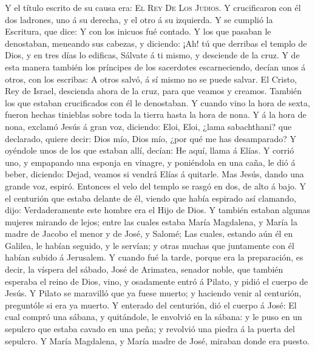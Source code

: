  Y el título escrito de su causa era: \textsc{El}
\textsc{Rey} \textsc{De} \textsc{Los} \textsc{Judios}.  Y
crucificaron con él dos ladrones, uno á su derecha, y el otro á su
izquierda.  Y se cumplió la Escritura, que dice: Y con
los inicuos fué contado.  Y los que pasaban le
denostaban, meneando sus cabezas, y diciendo: ¡Ah! tú que derribas el
templo de Dios, y en tres días lo edificas,  Sálvate á ti
mismo, y desciende de la cruz.  Y de esta manera también
los príncipes de los sacerdotes escarneciendo, decían unos á otros, con
los escribas: A otros salvó, á sí mismo no se puede salvar.
 El Cristo, Rey de Israel, descienda ahora de la cruz,
para que veamos y creamos. También los que estaban crucificados con él
le denostaban.  Y cuando vino la hora de sexta, fueron
hechas tinieblas sobre toda la tierra hasta la hora de nona.
 Y á la hora de nona, exclamó Jesús á gran voz, diciendo:
Eloi, Eloi, ¿lama sabachthani? que declarado, quiere decir: Dios mío,
Dios mío, ¿por qué me has desamparado?  Y oyéndole unos
de los que estaban allí, decían: He aquí, llama á Elías. 
Y corrió uno, y empapando una esponja en vinagre, y poniéndola en una
caña, le dió á beber, diciendo: Dejad, veamos si vendrá Elías á
quitarle.  Mas Jesús, dando una grande voz, espiró.
 Entonces el velo del templo se rasgó en dos, de alto á
bajo.  Y el centurión que estaba delante de él, viendo
que había espirado así clamando, dijo: Verdaderamente este hombre era el
Hijo de Dios.  Y también estaban algunas mujeres mirando
de lejos; entre las cuales estaba María Magdalena, y María la madre de
Jacobo el menor y de José, y Salomé;  Las cuales, estando
aún él en Galilea, le habían seguido, y le servían; y otras muchas que
juntamente con él habían subido á Jerusalem.  Y cuando
fué la tarde, porque era la preparación, es decir, la víspera del
sábado,  José de Arimatea, senador noble, que también
esperaba el reino de Dios, vino, y osadamente entró á Pilato, y pidió el
cuerpo de Jesús.  Y Pilato se maravilló que ya fuese
muerto; y haciendo venir al centurión, preguntóle si era ya muerto.
 Y enterado del centurión, dió el cuerpo á José:
 El cual compró una sábana, y quitándole, le envolvió en
la sábana: y le puso en un sepulcro que estaba cavado en una peña; y
revolvió una piedra á la puerta del sepulcro.  Y María
Magdalena, y María madre de José, miraban donde era puesto.

